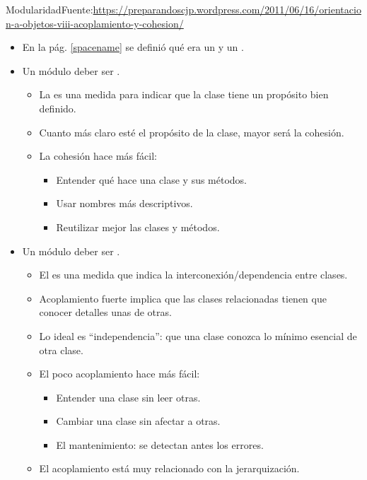 \documentclass[10pt,envcountsect,spanish]{beamer}
\begin{document}
\begin{frame}{Modularidad}{Fuente:\tiny\url{https://preparandoscjp.wordpress.com/2011/06/16/orientacion-a-objetos-viii-acoplamiento-y-cohesion/}}
\begin{itemize}
\item En la pág. \ref{spacename} se definió qué era un  y un .

\item Un módulo deber ser .

\begin{itemize}
\item La  es una medida para indicar que la clase tiene un propósito   bien definido.
\item Cuanto más claro esté el propósito de la clase, mayor será la cohesión.
\item La cohesión hace más fácil:
\begin{itemize}
\item Entender qué hace una clase y sus métodos.
\item Usar nombres más descriptivos.
\item Reutilizar mejor las clases y métodos.
\end{itemize}
\end{itemize}


\item Un módulo deber ser .

\begin{itemize}
\item El  es una medida que indica la interconexión/dependencia entre clases.
\item Acoplamiento fuerte implica que las clases relacionadas tienen que conocer detalles unas de otras.
\item Lo ideal es ``independencia'': que una clase conozca lo mínimo esencial de otra clase. 
\item El poco acoplamiento hace más fácil:
\begin{itemize}
\item Entender una clase sin leer otras.
\item Cambiar una clase sin afectar a otras.
\item El mantenimiento: se detectan antes los errores.
\end{itemize}

\item El acoplamiento está muy relacionado con la jerarquización.
\end{itemize}

\end{itemize}
\end{frame}
\end{document}
